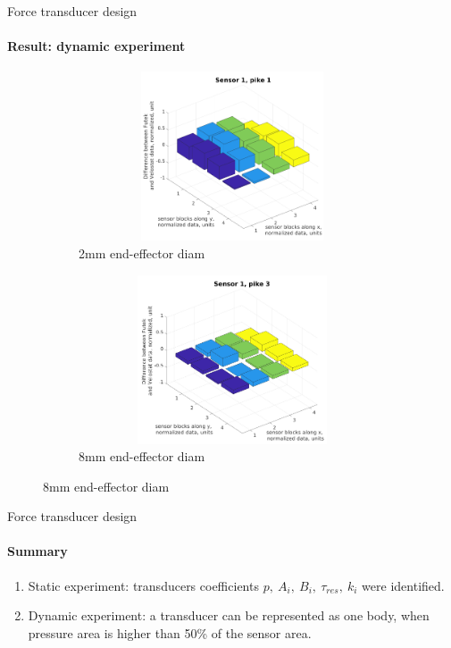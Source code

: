 \documentclass[aspectratio=169]{beamer}
\begin{document}
\begin{frame}[t]{Force transducer design}
    \framesubtitle{Result: dynamic experiment}
    \vspace{-15pt}
    \begin{figure}[H]
        \begin{subfigure}{0.49\textwidth}
            \centering\includegraphics[height=5cm,width=1\textwidth,keepaspectratio]{sens1_pike1.png}
            \caption*{2mm end-effector diam}
            \label{fig:sens1_pike1}
        \end{subfigure}
        \begin{subfigure}{0.49\textwidth}
            \centering\includegraphics[height=5cm,width=1\textwidth,keepaspectratio]{sens1_pike3.png}
            \caption*{8mm end-effector diam}
            \label{fig:sens1_pike3}
        \end{subfigure}
    \end{figure}
\end{frame}

\begin{frame}[t]{Force transducer design}
    \framesubtitle{Summary}
    \vspace{-15pt}
    {\Large
        \begin{enumerate}
            \item Static experiment: transducers coefficients $p,\ A_i,\ B_i,\ \tau_{res},\ k_i$ were identified.
            \item Dynamic experiment: a transducer can be represented as one body, when pressure area is higher than 50\% of the sensor area.
        \end{enumerate}
    }
\end{frame}
\end{document}
